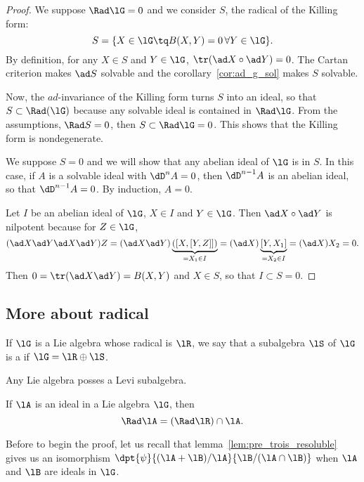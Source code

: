 \begin{proof}
We suppose $\Rad\lG=0$ and we consider $S$, the radical of the Killing form:
\[
   S=\{X\in\lG\tq B(X,Y)=0\,\forall Y\in\lG\}.
\]
By definition, for any $X\in S$ and $Y\in\lG$, $\tr(\ad X\circ\ad Y)=0$. The Cartan criterion makes $\ad S$ solvable and the corollary~\ref{cor:ad_g_sol} makes $S$ solvable.

Now, the $ad$-invariance of the Killing form turns $S$ into an ideal, so that $S\subset\Rad(\lG)$ because any solvable ideal is contained in $\Rad\lG$. From the assumptions, $\Rad S=0$, then $S\subset\Rad\lG=0$. This shows that the Killing form is nondegenerate.

We suppose $S=0$ and we will show that any abelian ideal of $\lG$ is in $S$. In this case, if $A$ is a solvable ideal with $\dD^nA=0$, then $\dD^{n-1}A$ is an abelian ideal, so that $\dD^{n-1}A=0$. By induction, $A=0$.

Let $I$ be an abelian ideal of $\lG$, $X\in I$ and $Y\in\lG$. Then $\ad X\circ\ad Y$ is nilpotent because for $Z\in\lG$,
\begin{equation}
  (\ad X\ad Y\ad X\ad Y)Z=(\ad X\ad Y)\underbrace{( [X,[Y,Z]] )}_{=X_1\in I}
                         =(\ad X)\underbrace{[Y,X_1]}_{=X_2\in I}
             =(\ad X)X_2
             =0.
\end{equation}
Then $0=\tr(\ad X\ad Y)=B(X,Y)$ and $X\in S$, so that $I\subset S=0$.

\end{proof}

\subsection{More about radical}

If $\lG$ is a Lie algebra whose radical is $\lR$, we say that a subalgebra $\lS$ of $\lG$ is a  if $\lG=\lR\oplus\lS$.

Any Lie algebra posses a Levi subalgebra.

\begin{lemma}
If $\lA$ is an ideal in a Lie algebra $\lG$, then
\[
  \Rad\lA=(\Rad\lR)\cap\lA.
\]
\label{lem:rad_ideal}
\end{lemma}

Before to begin the proof, let us recall that lemma~\ref{lem:pre_trois_resoluble} gives us an isomorphism $\dpt{\psi}{(\lA+\lB)/\lA}{\lB/(\lA\cap\lB)}$ when $\lA$ and $\lB$ are ideals in $\lG$.

